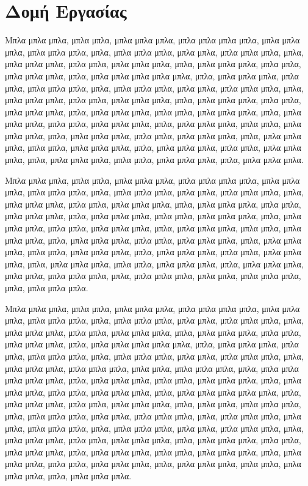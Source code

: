 \documentclass[diploma]{softlab-thesis}
\begin{document}
\section{Δομή Εργασίας}

Μπλα μπλα μπλα, μπλα μπλα, μπλα μπλα μπλα, μπλα μπλα μπλα μπλα,
μπλα μπλα μπλα, μπλα μπλα μπλα, μπλα, μπλα μπλα μπλα, μπλα μπλα,
μπλα μπλα μπλα, μπλα, μπλα μπλα μπλα, μπλα μπλα, μπλα μπλα μπλα,
μπλα, μπλα μπλα μπλα, μπλα μπλα, μπλα μπλα μπλα, μπλα, μπλα μπλα
μπλα μπλα μπλα, μπλα, μπλα μπλα μπλα, μπλα μπλα, μπλα μπλα μπλα,
μπλα, μπλα μπλα μπλα, μπλα μπλα, μπλα μπλα μπλα, μπλα, μπλα μπλα
μπλα, μπλα μπλα, μπλα μπλα μπλα, μπλα, μπλα μπλα μπλα, μπλα μπλα,
μπλα \nocite{*} μπλα μπλα, μπλα, μπλα μπλα μπλα, μπλα μπλα, μπλα
μπλα μπλα, μπλα, μπλα μπλα μπλα, μπλα μπλα, μπλα μπλα μπλα, μπλα,
μπλα μπλα μπλα, μπλα μπλα, μπλα μπλα μπλα, μπλα, μπλα μπλα μπλα,
μπλα μπλα, μπλα μπλα μπλα, μπλα, μπλα μπλα μπλα, μπλα μπλα, μπλα
μπλα μπλα, μπλα, μπλα μπλα μπλα, μπλα μπλα, μπλα μπλα μπλα, μπλα,
μπλα μπλα μπλα, μπλα μπλα, μπλα μπλα μπλα, μπλα, μπλα μπλα μπλα.

Μπλα μπλα μπλα, μπλα μπλα, μπλα μπλα μπλα, μπλα μπλα μπλα μπλα,
μπλα μπλα μπλα, μπλα μπλα μπλα, μπλα, μπλα μπλα μπλα, μπλα μπλα,
μπλα μπλα μπλα, μπλα, μπλα μπλα μπλα, μπλα μπλα, μπλα μπλα μπλα,
μπλα, μπλα μπλα μπλα, μπλα μπλα, μπλα μπλα μπλα, μπλα, μπλα μπλα
μπλα, μπλα μπλα, μπλα μπλα μπλα, μπλα, μπλα μπλα μπλα, μπλα μπλα,
μπλα μπλα μπλα, μπλα, μπλα μπλα μπλα, μπλα μπλα, μπλα μπλα μπλα,
μπλα, μπλα μπλα μπλα, μπλα μπλα, μπλα μπλα μπλα, μπλα, μπλα μπλα
μπλα, μπλα μπλα, μπλα μπλα μπλα, μπλα, μπλα μπλα μπλα, μπλα μπλα,
μπλα μπλα μπλα, μπλα, μπλα μπλα μπλα, μπλα μπλα, μπλα μπλα μπλα,
μπλα, μπλα μπλα μπλα, μπλα μπλα, μπλα μπλα μπλα, μπλα, μπλα μπλα
μπλα, μπλα μπλα, μπλα μπλα μπλα, μπλα, μπλα μπλα μπλα.

Μπλα μπλα μπλα, μπλα μπλα, μπλα μπλα μπλα, μπλα μπλα μπλα μπλα,
μπλα μπλα μπλα, μπλα μπλα μπλα, μπλα, μπλα μπλα μπλα, μπλα μπλα,
μπλα μπλα μπλα, μπλα, μπλα μπλα μπλα, μπλα μπλα, μπλα μπλα μπλα,
μπλα, μπλα μπλα μπλα, μπλα μπλα, μπλα μπλα μπλα, μπλα, μπλα μπλα
μπλα μπλα μπλα, μπλα, μπλα μπλα μπλα, μπλα μπλα, μπλα μπλα μπλα,
μπλα, μπλα μπλα μπλα, μπλα μπλα, μπλα μπλα μπλα, μπλα, μπλα μπλα
μπλα, μπλα μπλα μπλα, μπλα μπλα, μπλα μπλα μπλα, μπλα, μπλα μπλα
μπλα μπλα μπλα, μπλα, μπλα μπλα μπλα, μπλα μπλα, μπλα μπλα μπλα,
μπλα, μπλα μπλα μπλα, μπλα μπλα, μπλα μπλα μπλα, μπλα, μπλα μπλα
μπλα μπλα μπλα, μπλα, μπλα μπλα μπλα, μπλα μπλα, μπλα μπλα μπλα,
μπλα, μπλα μπλα, μπλα μπλα μπλα, μπλα, μπλα μπλα μπλα, μπλα μπλα,
μπλα μπλα μπλα, μπλα, μπλα μπλα μπλα, μπλα μπλα, μπλα μπλα μπλα,
μπλα, μπλα μπλα μπλα, μπλα μπλα, μπλα μπλα μπλα, μπλα, μπλα μπλα
μπλα, μπλα μπλα, μπλα μπλα μπλα, μπλα, μπλα μπλα μπλα, μπλα μπλα,
μπλα μπλα μπλα, μπλα, μπλα μπλα μπλα, μπλα μπλα, μπλα μπλα μπλα,
μπλα, μπλα μπλα μπλα, μπλα μπλα, μπλα μπλα μπλα, μπλα, μπλα μπλα
μπλα, μπλα μπλα, μπλα μπλα μπλα, μπλα, μπλα μπλα μπλα.
\end{document}
